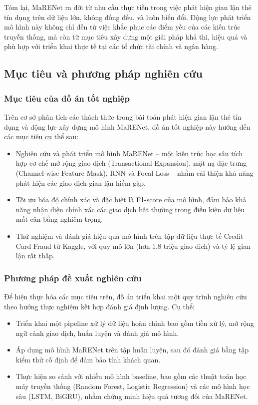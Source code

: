 Tóm lại, MaRENet ra đời từ nhu cầu thực tiễn trong việc phát hiện gian lận thẻ tín dụng trên dữ liệu lớn, không đồng đều, và luôn biến đổi. Động lực phát triển mô hình này không chỉ đến từ việc khắc phục các điểm yếu của các kiến trúc truyền thống, mà còn từ mục tiêu xây dựng một giải pháp khả thi, hiệu quả và phù hợp với triển khai thực tế tại các tổ chức tài chính và ngân hàng.

\subsection{Mục tiêu và phương pháp nghiên cứu}
\subsubsection{Mục tiêu của đồ án tốt nghiệp}

Trên cơ sở phân tích các thách thức trong bài toán phát hiện gian lận thẻ tín dụng và động lực xây dựng mô hình MaRENet, đồ án tốt nghiệp này hướng đến các mục tiêu cụ thể sau:

\begin{itemize}
    \item Nghiên cứu và phát triển mô hình MaRENet – một kiến trúc học sâu tích hợp cơ chế mở rộng giao dịch (Transactional Expansion), mặt nạ đặc trưng (Channel-wise Feature Mask), RNN và Focal Loss – nhằm cải thiện khả năng phát hiện các giao dịch gian lận hiếm gặp.
    \item Tối ưu hóa độ chính xác và đặc biệt là F1-score của mô hình, đảm bảo khả năng nhận diện chính xác các giao dịch bất thường trong điều kiện dữ liệu mất cân bằng nghiêm trọng.
    \item Thử nghiệm và đánh giá hiệu quả mô hình trên tập dữ liệu thực tế Credit Card Fraud từ Kaggle, với quy mô lớn (hơn 1.8 triệu giao dịch) và tỷ lệ gian lận rất thấp.
\end{itemize}

\subsubsection{Phương pháp đề xuất nghiên cứu}

Để hiện thực hóa các mục tiêu trên, đồ án triển khai một quy trình nghiên cứu theo hướng thực nghiệm kết hợp đánh giá định lượng. Cụ thể:

\begin{itemize}
    \item Triển khai một pipeline xử lý dữ liệu hoàn chỉnh bao gồm tiền xử lý, mở rộng ngữ cảnh giao dịch, huấn luyện và đánh giá mô hình.
    \item Áp dụng mô hình MaRENet trên tập huấn luyện, sau đó đánh giá bằng tập kiểm thử cố định để đảm bảo tính khách quan.
    \item Thực hiện so sánh với nhiều mô hình baseline, bao gồm các thuật toán học máy truyền thống (Random Forest, Logistic Regression) và các mô hình học sâu (LSTM, BiGRU), nhằm chứng minh hiệu quả tương đối của MaRENet.
\end{itemize}

